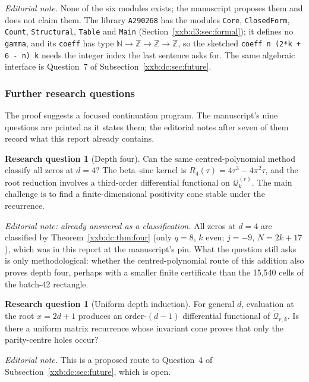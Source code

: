 \documentclass[11pt,a4paper]{article}
\numberwithin{equation}{section}
\theoremstyle{definition}
\newtheorem{question}[theorem]{Research question}
\theoremstyle{remark}
\theoremstyle{plain}
\newcommand{\Z}{\mathbb Z}
\newcommand{\N}{\mathbb N}
\begin{document}
\emph{Editorial note.}  None of the six modules exists; the manuscript
proposes them and does not claim them.  The library \texttt{A290268} has the
modules \texttt{Core}, \texttt{ClosedForm}, \texttt{Count},
\texttt{Structural}, \texttt{Table} and \texttt{Main}
(Section~\ref{xxb:d3:sec:formal}); it defines no \texttt{gamma}, and its
\texttt{coeff} has type $\N\to\Z\to\Z\to\Z$, so the sketched
\texttt{coeff n (2*k + 6 - n) k} needs the integer index the last sentence
asks for.  The same algebraic interface is Question~7 of
Subsection~\ref{xxb:dc:sec:future}.

\subsubsection{Further research questions}\label{xxb:d3:sec:further}

The proof suggests a focused continuation program.  The manuscript's nine
questions are printed as it states them; the editorial notes after seven of
them record what this report already contains.

\begin{question}[Depth four]\label{xxb:d3:q:depth-four}
Can the same centred-polynomial method classify all zeros at $d=4$?  The
beta--sine kernel is $R_4(\tau)=4\tau^3-4\pi^2\tau$,
and the root reduction involves a third-order differential functional on
$\mathcal Q_k^{(r)}$.  The main challenge is to find a finite-dimensional
positivity cone stable under the recurrence.
\end{question}

\emph{Editorial note: already answered as a classification.}  All zeros at
$d=4$ are classified by Theorem~\ref{xxb:dc:thm:four} (only $q=8$, $k$ even;
$j=-9$, $N=2k+17$), which was in this report at the manuscript's pin.  What the
question still asks is only methodological: whether the centred-polynomial
route of this addition also proves depth four, perhaps with a smaller finite
certificate than the 15,540 cells of the batch-42 rectangle.

\begin{question}[Uniform depth induction]
For general $d$, evaluation at the root $x=2d+1$ produces an order-$(d-1)$
differential functional of $\widetilde{\mathcal Q}_{r,k}$.  Is there a uniform
matrix recurrence whose invariant cone proves that only the parity-centre holes
occur?
\end{question}

\emph{Editorial note.}  This is a proposed route to Question~4 of
Subsection~\ref{xxb:dc:sec:future}, which is open.
\end{document}
